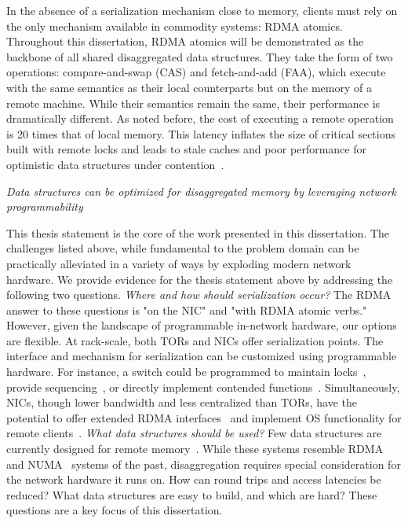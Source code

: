 \documentclass[12pt]{ucsddissertation}
\begin{document}
\begin{dissertationintroduction}
In the absence of a serialization mechanism close to memory, clients must rely on the only mechanism
available in commodity systems: RDMA atomics. Throughout this dissertation, RDMA atomics will be
demonstrated as the backbone of all shared disaggregated data structures. They take the form of two
operations: compare-and-swap (CAS) and fetch-and-add (FAA), which execute with the same semantics as
their local counterparts but on the memory of a remote machine. While their semantics remain the
same, their performance is dramatically different. As noted before, the cost of executing a remote
operation is 20 times that of local memory. This latency inflates the size of critical sections
built with remote locks and leads to stale caches and poor performance for optimistic data
structures under contention~\cite{clover,sherman,fusee,race,rolex}.

\begin{center}
\textit{Data structures can be optimized for disaggregated memory by leveraging network programmability} \\
\end{center}

This thesis statement is the core of the work presented in this dissertation. The challenges listed
above, while fundamental to the problem domain can be practically alleviated in a variety of ways by
exploding modern network hardware. We provide evidence for the thesis statement above by addressing
the following two questions.
\textit{Where and how should serialization occur?} The RDMA answer to these questions is "on the
NIC" and "with RDMA atomic verbs." However, given the landscape of programmable in-network hardware,
our options are flexible. At rack-scale, both TORs and NICs offer serialization points. The
interface and mechanism for serialization can be customized using programmable hardware. For
instance, a switch could be programmed to maintain locks~\cite{netlock}, provide
sequencing~\cite{when-computer}, or directly implement contended functions~\cite{mind}.
Simultaneously, NICs, though lower bandwidth and less centralized than TORs, have the potential to
offer extended RDMA interfaces~\cite{prism} and implement OS functionality for remote
clients~\cite{clio, supernic}.
\textit{What data structures should be used?} Few data structures are currently designed for remote
memory~\cite{clover,fusee,race,sherman,rolex,ditto}. While these systems resemble
RDMA~\cite{pilaf,herd,cell} and NUMA~\cite{flat-combining,hopscotch,bbn} systems of the past, disaggregation
requires special consideration for the network hardware it runs on. How can round trips and access
latencies be reduced? What data structures are easy to build, and which are hard? These questions
are a key focus of this dissertation.


\end{dissertationintroduction}
\end{document}
